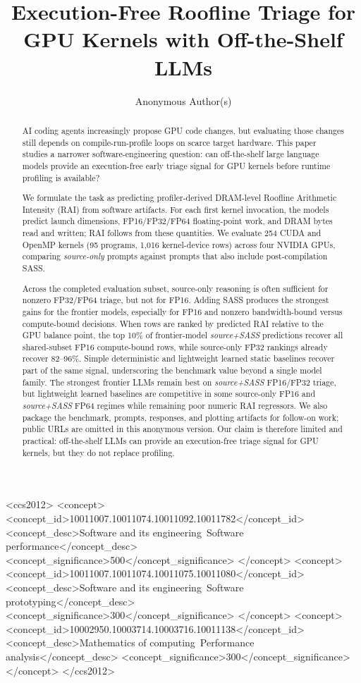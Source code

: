 \documentclass[sigconf,review,anonymous]{acmart}
\title{Execution-Free Roofline Triage for GPU Kernels with Off-the-Shelf LLMs}
\author{Anonymous Author(s)}
\affiliation{%
  \institution{Anonymous Institution(s)}
  \country{Anonymous}
}
\newcommand{\rai}{RAI\xspace}
\newcommand{\sourceonly}{\textit{source-only}\xspace}
\newcommand{\sourcesass}{\textit{source+SASS}\xspace}
\begin{document}
\begin{abstract}
AI coding agents increasingly propose GPU code changes, but evaluating those changes still depends on compile-run-profile loops on scarce target hardware.
This paper studies a narrower software-engineering question: can off-the-shelf large language models provide an execution-free early triage signal for GPU kernels before runtime profiling is available?

We formulate the task as predicting profiler-derived DRAM-level Roofline Arithmetic Intensity (\rai) from software artifacts.
For each first kernel invocation, the models predict launch dimensions, FP16/FP32/FP64 floating-point work, and DRAM bytes read and written; \rai follows from these quantities.
We evaluate 254 CUDA and OpenMP kernels (95 programs, 1{,}016 kernel-device rows) across four NVIDIA GPUs, comparing \sourceonly prompts against prompts that also include post-compilation SASS.

Across the completed evaluation subset, source-only reasoning is often sufficient for nonzero FP32/FP64 triage, but not for FP16.
Adding SASS produces the strongest gains for the frontier models, especially for FP16 and nonzero bandwidth-bound versus compute-bound decisions.
When rows are ranked by predicted \rai relative to the GPU balance point, the top 10\% of frontier-model \sourcesass predictions recover all shared-subset FP16 compute-bound rows, while source-only FP32 rankings already recover 82--96\%.
Simple deterministic and lightweight learned static baselines recover part of the same signal, underscoring the benchmark value beyond a single model family.
The strongest frontier LLMs remain best on \sourcesass FP16/FP32 triage, but lightweight learned baselines are competitive in some source-only FP16 and \sourcesass FP64 regimes while remaining poor numeric \rai regressors.
We also package the benchmark, prompts, responses, and plotting artifacts for follow-on work; public URLs are omitted in this anonymous version.
Our claim is therefore limited and practical: off-the-shelf LLMs can provide an execution-free triage signal for GPU kernels, but they do not replace profiling.
\end{abstract}


\begin{CCSXML}
<ccs2012>
<concept>
<concept_id>10011007.10011074.10011092.10011782</concept_id>
<concept_desc>Software and its engineering~Software performance</concept_desc>
<concept_significance>500</concept_significance>
</concept>
<concept>
<concept_id>10011007.10011074.10011075.10011080</concept_id>
<concept_desc>Software and its engineering~Software prototyping</concept_desc>
<concept_significance>300</concept_significance>
</concept>
<concept>
<concept_id>10002950.10003714.10003716.10011138</concept_id>
<concept_desc>Mathematics of computing~Performance analysis</concept_desc>
<concept_significance>300</concept_significance>
</concept>
</ccs2012>
\end{CCSXML}
\end{document}
